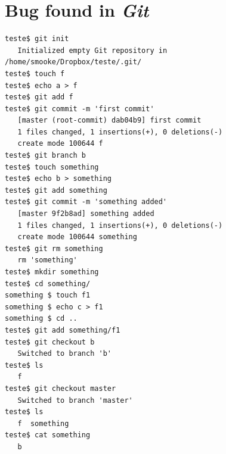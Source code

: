 \chapter{Bug found in \emph{Git}}
\label{bugappend}
\begin{lstlisting}
teste$ git init
   Initialized empty Git repository in /home/smooke/Dropbox/teste/.git/
teste$ touch f
teste$ echo a > f
teste$ git add f
teste$ git commit -m 'first commit'
   [master (root-commit) dab04b9] first commit
   1 files changed, 1 insertions(+), 0 deletions(-)
   create mode 100644 f
teste$ git branch b
teste$ touch something
teste$ echo b > something
teste$ git add something
teste$ git commit -m 'something added'
   [master 9f2b8ad] something added
   1 files changed, 1 insertions(+), 0 deletions(-)
   create mode 100644 something
teste$ git rm something
   rm 'something'
teste$ mkdir something
teste$ cd something/
something $ touch f1
something $ echo c > f1
something $ cd ..
teste$ git add something/f1
teste$ git checkout b
   Switched to branch 'b'
teste$ ls
   f
teste$ git checkout master
   Switched to branch 'master'
teste$ ls
   f  something
teste$ cat something
   b
\end{lstlisting}

\label{bugappend2}

